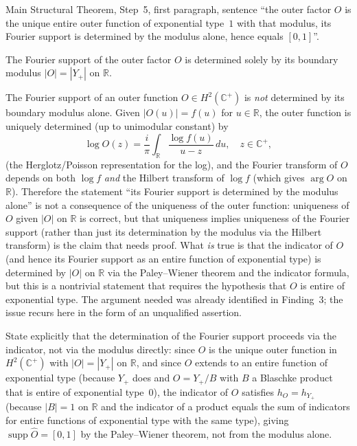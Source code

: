 \documentclass[11pt]{article}
\newcommand{\R}{\mathbb{R}}
\newcommand{\C}{\mathbb{C}}
\begin{document}
\begin{description}[leftmargin=0pt]
\item[Location:]
Main Structural Theorem, Step~5, first paragraph, sentence
``the outer factor $O$ is the unique entire outer function of exponential type~$1$
with that modulus, its Fourier support is determined by the modulus alone,
hence equals $[0,1]$''.

\item[Claim as written:]
The Fourier support of the outer factor $O$ is determined solely by its boundary
modulus $|O|=|Y_+|$ on $\R$.

\item[What is relied on but not established in the text:]
The Fourier support of an outer function $O\in H^2(\C^+)$ is \emph{not} determined
by its boundary modulus alone.
Given $|O(u)|=f(u)$ for $u\in\R$, the outer function is uniquely determined
(up to unimodular constant) by
\[
\log O(z)=\frac{i}{\pi}\int_\R\frac{\log f(u)}{u-z}\,du,\quad z\in\C^+,
\]
(the Herglotz/Poisson representation for the log), and the Fourier transform of
$O$ depends on both $\log f$ \emph{and} the Hilbert transform of $\log f$
(which gives $\arg O$ on $\R$).
Therefore the statement ``its Fourier support is determined by the modulus alone''
is not a consequence of the uniqueness of the outer function:
uniqueness of $O$ given $|O|$ on $\R$ is correct, but that uniqueness implies
uniqueness of the Fourier support (rather than just its determination by the
modulus via the Hilbert transform) is the claim that needs proof.
What \emph{is} true is that the indicator of $O$ (and hence its Fourier support
as an entire function of exponential type) is determined by $|O|$ on $\R$ via
the Paley--Wiener theorem and the indicator formula, but this is a nontrivial
statement that requires the hypothesis that $O$ is entire of exponential type.
The argument needed was already identified in Finding~3; the issue recurs here
in the form of an unqualified assertion.

\item[What would establish it:]
State explicitly that the determination of the Fourier support proceeds via the
indicator, not via the modulus directly:
since $O$ is the unique outer function in $H^2(\C^+)$ with $|O|=|Y_+|$ on $\R$,
and since $O$ extends to an entire function of exponential type (because $Y_+$ does
and $O=Y_+/B$ with $B$ a Blaschke product that is entire of exponential type~$0$),
the indicator of $O$ satisfies $h_O=h_{Y_+}$ (because $|B|=1$ on $\R$ and the
indicator of a product equals the sum of indicators for entire functions of
exponential type with the same type), giving
$\operatorname{supp}\hat O=[0,1]$ by the Paley--Wiener theorem, not from the
modulus alone.
\end{description}
\end{document}
